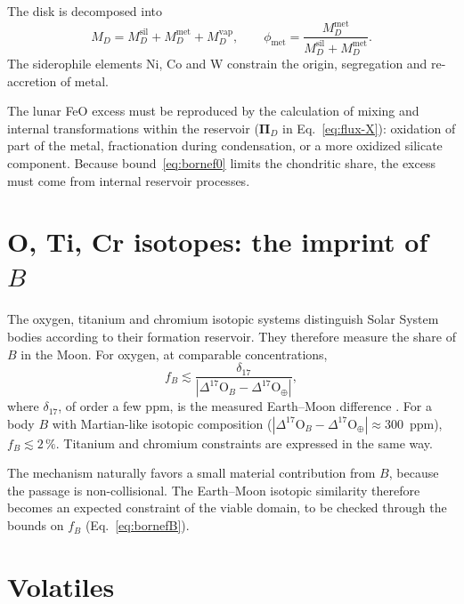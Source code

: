\documentclass[11pt,a4paper,openany]{report}
\begin{document}
The disk is decomposed into
\begin{equation}
M_D=M_D^{\mathrm{sil}}+M_D^{\mathrm{met}}+M_D^{\mathrm{vap}},
\qquad
\phi_{\mathrm{met}}=\frac{M_D^{\mathrm{met}}}{M_D^{\mathrm{sil}}+M_D^{\mathrm{met}}}.
\label{eq:metal}
\end{equation}
The siderophile elements Ni, Co and W constrain the origin, segregation and re-accretion of metal.

\begin{consequence}
The lunar FeO excess must be reproduced by the calculation of mixing and internal transformations
within the reservoir ($\boldsymbol{\Pi}_D$ in Eq.~\eqref{eq:flux-X}): oxidation of part of the metal,
fractionation during condensation, or a more oxidized silicate component. Because
bound~\eqref{eq:bornef0} limits the chondritic share, the excess must come from internal reservoir
processes.
\end{consequence}

\section{O, Ti, Cr isotopes: the imprint of \texorpdfstring{$B$}{B}}
\label{sec:bornes}

The oxygen, titanium and chromium isotopic systems distinguish Solar System bodies according to
their formation reservoir. They therefore measure the share of $B$ in the Moon. For oxygen, at
comparable concentrations,
\begin{equation}
f_B\lesssim\frac{\delta_{17}}{|\Delta^{17}\mathrm{O}_B-\Delta^{17}\mathrm{O}_\oplus|},
\label{eq:bornefB}
\end{equation}
where $\delta_{17}$, of order a few ppm, is the measured Earth--Moon difference \cite{Young2016}.
For a body $B$ with Martian-like isotopic composition
($|\Delta^{17}\mathrm{O}_B-\Delta^{17}\mathrm{O}_\oplus|\approx300$~ppm), $f_B\lesssim2\,\%$.
Titanium \cite{Zhang2012} and chromium constraints are expressed in the same way.

\begin{apport}
The mechanism naturally favors a small material contribution from $B$, because the passage is
non-collisional. The Earth--Moon isotopic similarity therefore becomes an expected constraint of
the viable domain, to be checked through the bounds on $f_B$ (Eq.~\eqref{eq:bornefB}).
\end{apport}

\section{Volatiles}
\end{document}
